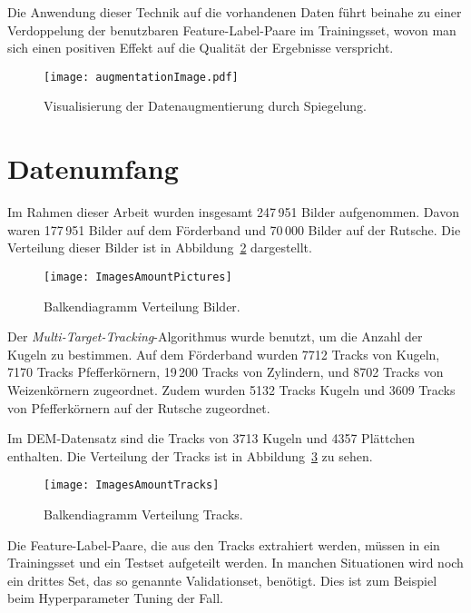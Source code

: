 Die Anwendung dieser Technik auf die vorhandenen Daten führt beinahe zu einer Verdoppelung 
der benutzbaren Feature-Label-Paare im Trainingsset, wovon man sich einen positiven Effekt auf die Qualität der Ergebnisse verspricht.

\begin{figure}[h]
	\centering
	\texttt{[image: augmentationImage.pdf]}
	\caption{Visualisierung der Datenaugmentierung durch Spiegelung.}
	\label{fig:dataAugm}
\end{figure}



\section{Datenumfang}

Im Rahmen dieser Arbeit wurden insgesamt 247\,951 Bilder aufgenommen.
Davon waren 177\,951 Bilder auf dem Förderband und 70\,000 Bilder auf der Rutsche.
Die Verteilung dieser Bilder ist in Abbildung~\ref{fig:barPics} dargestellt.

\begin{figure}[h]
	\centering
	\texttt{[image: ImagesAmountPictures]}
	\caption{Balkendiagramm Verteilung Bilder.}
	\label{fig:barPics}
\end{figure}

Der \textit{Multi-Target-Tracking}-Algorithmus wurde benutzt, um die Anzahl der Kugeln zu bestimmen.
Auf dem Förderband wurden 7712 Tracks von Kugeln,
7170 Tracks Pfefferkörnern,
19\,200 Tracks von Zylindern,
und 8702 Tracks von Weizenkörnern zugeordnet.
Zudem wurden 5132 Tracks Kugeln und 3609 Tracks von Pfefferkörnern auf der Rutsche zugeordnet.

Im DEM-Datensatz sind die Tracks von 3713 Kugeln und 4357 Plättchen enthalten.
Die Verteilung der Tracks ist in Abbildung~\ref{fig:barTracks} zu sehen.

\begin{figure}[h]
	\centering
	\texttt{[image: ImagesAmountTracks]}
	\caption{Balkendiagramm Verteilung Tracks.}
	\label{fig:barTracks}
\end{figure}

Die Feature-Label-Paare, die aus den Tracks extrahiert werden, 
müssen in ein Trainingsset und ein Testset aufgeteilt werden.
In manchen Situationen wird noch ein drittes Set, das so genannte Validationset, benötigt.
Dies ist zum Beispiel beim Hyperparameter Tuning der Fall.

